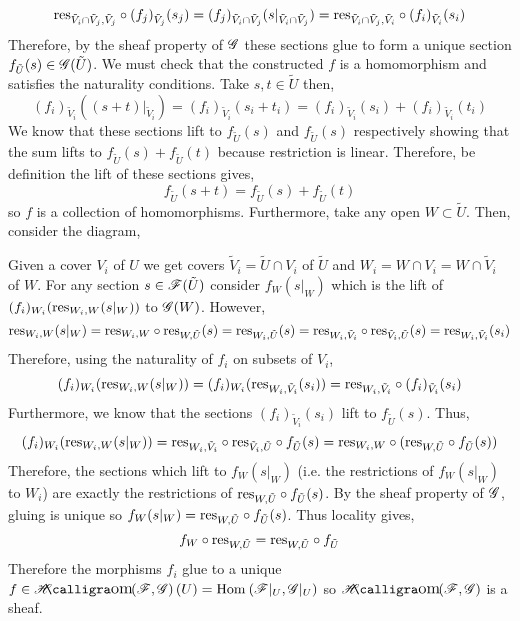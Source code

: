 \documentclass[12pt]{article}
\begin{document}
\[ \mathrm{res}_{\tilde{V}_i \cap \tilde{V}_j, \tilde{V}_j} \circ (f_j)_{\tilde{V}_j}(s_j) = (f_j)_{\tilde{V}_i \cap \tilde{V}_j}(s |_{\tilde{V}_i \cap \tilde{V}_j}) = \mathrm{res}_{\tilde{V}_i \cap \tilde{V}_j, \tilde{V}_i} \circ (f_i)_{\tilde{V}_i}(s_i) \]
Therefore, by the sheaf property of $\mathscr{G}$ these sections glue to form a unique section $f_{\tilde{U}}(s) \in \mathscr{G}(\tilde{U})$. We must check that the constructed $f$ is a homomorphism and satisfies the naturality conditions. Take $s,t \in \tilde{U}$ then,
\[ (f_i)_{\tilde{V}_i}((s + t)|_{\tilde{V}_i}) = (f_i)_{\tilde{V}_i}(s_i + t_i) = (f_i)_{\tilde{V}_i}(s_i) + (f_i)_{\tilde{V}_i}(t_i) \]
We know that these sections lift to $f_{\tilde{U}}(s)$ and $f_{\tilde{U}}(s)$ respectively showing that the sum lifts to $f_{\tilde{U}}(s) + f_{\tilde{U}}(t)$ because restriction is linear. Therefore, be definition the lift of these sections gives,
\[ f_{\tilde{U}}(s + t) = f_{\tilde{U}}(s) + f_{\tilde{U}}(t) \]
so $f$ is a collection of homomorphisms. Furthermore, take any open $W \subset \tilde{U}$. Then, consider the diagram,
\begin{center}
\end{center}  
Given a cover $V_i$ of $U$ we get covers $\tilde{V}_i = \tilde{U} \cap V_i$ of $\tilde{U}$ and $W_i = W \cap V_i = W \cap \tilde{V}_i$ of $W$. For any section $s \in \mathscr{F}(\tilde{U})$ consider $f_{W}(s|_W)$ which is the lift of $(f_i)_{W_i}(\mathrm{res}_{W_i, W} (s|_W))$ to $\mathscr{G}(W)$. However,
\[ \mathrm{res}_{W_i, W}(s|_W) = \mathrm{res}_{W_i, W} \circ \mathrm{res}_{W, \tilde{U}}(s) = \mathrm{res}_{W_i, \tilde{U}}(s) = \mathrm{res}_{W_i, \tilde{V}_i} \circ \mathrm{res}_{\tilde{V}_i, \tilde{U}}(s) = \mathrm{res}_{W_i, \tilde{V}_i}(s_i) \]
Therefore, using the naturality of $f_i$ on subsets of $V_i$,
\[ (f_i)_{W_i}(\mathrm{res}_{W_i, W} (s|_W)) = (f_i)_{W_i}(\mathrm{res}_{W_i, \tilde{V}_i}(s_i)) = \mathrm{res}_{W_i, \tilde{V}_i} \circ (f_i)_{\tilde{V}_i}(s_i) \]
Furthermore, we know that the sections $(f_i)_{\tilde{V}_i}(s_i)$ lift to $f_{\tilde{U}}(s)$. Thus,
\[ (f_i)_{W_i}(\mathrm{res}_{W_i, W} (s|_W)) = \mathrm{res}_{W_i, \tilde{V}_i} \circ \mathrm{res}_{\tilde{V}_i, \tilde{U}} \circ f_{\tilde{U}}(s) = \mathrm{res}_{W_i, W} \circ (\mathrm{res}_{W, \tilde{U}} \circ f_{\tilde{U}}(s)) \]
Therefore, the sections which lift to $f_W(s|_W)$ (i.e. the restrictions of $f_W(s|_W)$ to $W_i$) are exactly the restrictions of $\mathrm{res}_{W, \tilde{U}} \circ f_{\tilde{U}}(s)$. By the sheaf property of $\mathscr{G}$, gluing is unique so $f_W(s|_W) = \mathrm{res}_{W, \tilde{U}} \circ f_{\tilde{U}}(s)$. Thus locality gives,
\[ f_W \circ \mathrm{res}_{W, \tilde{U}} = \mathrm{res}_{W, \tilde{U}} \circ f_{\tilde{U}} \]
Therefore the morphisms $f_i$ glue to a unique $f \in \shHom{}{\F}{\G}(U) = \Hom{}{\F|_U}{\G|_U}$ so $\shHom{}{\F}{\G}$ is a sheaf. 
\end{document}
